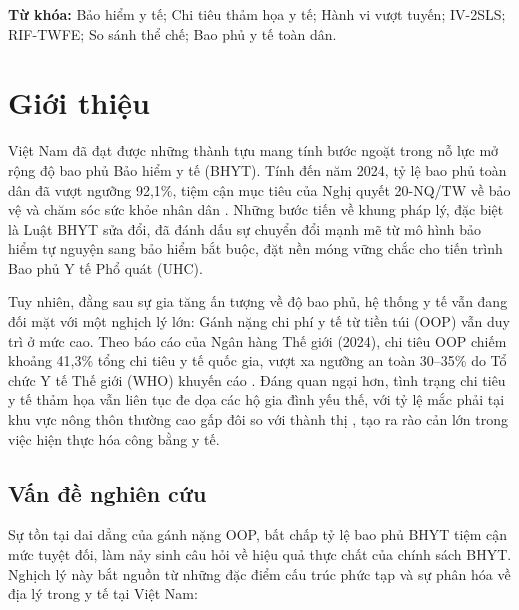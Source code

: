\documentclass[12pt,a4paper]{article}
\begin{document}
\vspace{0.5em}
\noindent \textbf{Từ khóa:} Bảo hiểm y tế; Chi tiêu thảm họa y tế; Hành vi vượt tuyến; IV-2SLS; RIF-TWFE; So sánh thể chế; Bao phủ y tế toàn dân.

\newpage
\section{Giới thiệu}

Việt Nam đã đạt được những thành tựu mang tính bước ngoặt trong nỗ lực mở rộng độ bao phủ Bảo hiểm y tế (BHYT). Tính đến năm 2024, tỷ lệ bao phủ toàn dân đã vượt ngưỡng 92,1\%, tiệm cận mục tiêu của Nghị quyết 20-NQ/TW về bảo vệ và chăm sóc sức khỏe nhân dân \parencite{gso2024}. Những bước tiến về khung pháp lý, đặc biệt là Luật BHYT sửa đổi, đã đánh dấu sự chuyển đổi mạnh mẽ từ mô hình bảo hiểm tự nguyện sang bảo hiểm bắt buộc, đặt nền móng vững chắc cho tiến trình Bao phủ Y tế Phổ quát (UHC).

Tuy nhiên, đằng sau sự gia tăng ấn tượng về độ bao phủ, hệ thống y tế vẫn đang đối mặt với một nghịch lý lớn: Gánh nặng chi phí y tế từ tiền túi (OOP) vẫn duy trì ở mức cao. Theo báo cáo của Ngân hàng Thế giới (2024), chi tiêu OOP chiếm khoảng 41,3\% tổng chi tiêu y tế quốc gia, vượt xa ngưỡng an toàn 30--35\% do Tổ chức Y tế Thế giới (WHO) khuyến cáo \parencite{who2023}. Đáng quan ngại hơn, tình trạng chi tiêu y tế thảm họa vẫn liên tục đe dọa các hộ gia đình yếu thế, với tỷ lệ mắc phải tại khu vực nông thôn thường cao gấp đôi so với thành thị \parencite{gso2024}, tạo ra rào cản lớn trong việc hiện thực hóa công bằng y tế.

\subsection{Vấn đề nghiên cứu}

Sự tồn tại dai dẳng của gánh nặng OOP, bất chấp tỷ lệ bao phủ BHYT tiệm cận mức tuyệt đối, làm nảy sinh câu hỏi về hiệu quả thực chất của chính sách BHYT. Nghịch lý này bắt nguồn từ những đặc điểm cấu trúc phức tạp và sự phân hóa về địa lý trong y tế tại Việt Nam:
\end{document}
